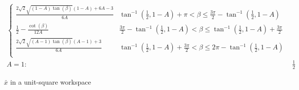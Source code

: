 \documentclass[conference]{IEEEtran}
\begin{document}
\begin{table*}
\begin{align}
\begin{cases}
 \frac{2 \sqrt{2} \sqrt{(1-A) \tan (\beta )} (1-A)+6 A-3}{6 A} & \tan ^{-1}\left(\frac{1}{2},1-A\right)+\pi <\beta \leq \frac{3 \pi }{2}-\tan ^{-1}\left(\frac{1}{2},1-A\right) \\
 \frac{1}{2}-\frac{\cot (\beta )}{12 A} & \frac{3 \pi }{2}-\tan ^{-1}\left(\frac{1}{2},1-A\right)<\beta \leq \tan ^{-1}\left(\frac{1}{2},1-A\right)+\frac{3 \pi }{2} \\
 \frac{2 \sqrt{2} \sqrt{(A-1) \tan (\beta )} (A-1)+3}{6 A} & \tan ^{-1}\left(\frac{1}{2},1-A\right)+\frac{3 \pi }{2}<\beta \leq 2 \pi -\tan ^{-1}\left(\frac{1}{2},1-A\right) \\
\end{cases}
 \nonumber \\
A=1: &\frac{1}{2}
\end{align}
\protect\caption{$\bar{x}$ in a unit-square workspace}
\label{tab:SquareXMean}
\end{table*}
\end{document}
